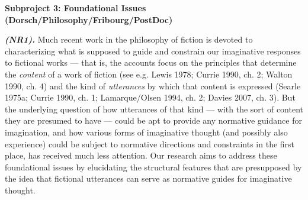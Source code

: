 

\vspace{.4cm}
\noindent\textbf{Subproject 3: Foundational Issues (Dorsch/Philosophy/Fribourg/PostDoc)}
\vspace{.2cm}

\noindent \textbf{\emph{(NR1).}} Much recent work in the philosophy of fiction is devoted to characterizing what is supposed to guide and constrain our imaginative responses to fictional works --- that is, the accounts focus on the principles that determine the \emph{content} of a work of fiction (see e.g. Lewis 1978; Currie 1990, ch. 2; Walton 1990, ch. 4) and the kind of \emph{utterances} by which that content is expressed (Searle 1975a; Currie 1990, ch. 1; Lamarque/Olsen 1994, ch. 2; Davies 2007, ch. 3). But the underlying question of how utterances of that kind --- with the sort of content they are presumed to have --- could be apt to provide any normative guidance for imagination, and how various forms of imaginative thought (and possibly also experience) could be subject to normative directions and constraints in the first place, has received much less attention. Our research aims to address these foundational issues by elucidating the structural features that are presupposed by the idea that fictional utterances can serve as normative guides for imaginative thought.

